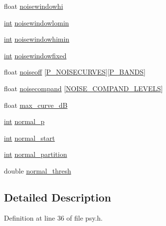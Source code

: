 \begin{DoxyCompactItemize}
float \hyperlink{structvorbis__info__psy_a8337b6979fcf921b4f975f3a88cf0394}{noisewindowhi}
\item 
\hyperlink{xmltok_8h_a5a0d4a5641ce434f1d23533f2b2e6653}{int} \hyperlink{structvorbis__info__psy_a2db09fd0e801f1b6f2c99850391fd940}{noisewindowlomin}
\item 
\hyperlink{xmltok_8h_a5a0d4a5641ce434f1d23533f2b2e6653}{int} \hyperlink{structvorbis__info__psy_ae3d1c2bece355a1dc347ea0f04e51a38}{noisewindowhimin}
\item 
\hyperlink{xmltok_8h_a5a0d4a5641ce434f1d23533f2b2e6653}{int} \hyperlink{structvorbis__info__psy_a6cb2aeec6204b044c4b4279c22e22d56}{noisewindowfixed}
\item 
float \hyperlink{structvorbis__info__psy_aa9386a43b2fed4d8d322beeb86ca716c}{noiseoff} \mbox{[}\hyperlink{psy_8h_a179ea3e4fa2cdb1ef235e922ea51405a}{P\+\_\+\+N\+O\+I\+S\+E\+C\+U\+R\+V\+ES}\mbox{]}\mbox{[}\hyperlink{psy_8h_ae6af2ec0a0f6e0813ae814e9a07c728a}{P\+\_\+\+B\+A\+N\+DS}\mbox{]}
\item 
float \hyperlink{structvorbis__info__psy_a30e0f5a53a3803feabbe826578c8a5e7}{noisecompand} \mbox{[}\hyperlink{psy_8h_a370d177dee7c7401b0c46ed37310d54b}{N\+O\+I\+S\+E\+\_\+\+C\+O\+M\+P\+A\+N\+D\+\_\+\+L\+E\+V\+E\+LS}\mbox{]}
\item 
float \hyperlink{structvorbis__info__psy_a8aeb497662b106e241bd3232016aba66}{max\+\_\+curve\+\_\+dB}
\item 
\hyperlink{xmltok_8h_a5a0d4a5641ce434f1d23533f2b2e6653}{int} \hyperlink{structvorbis__info__psy_ae6765718469a8efa31817f451996951f}{normal\+\_\+p}
\item 
\hyperlink{xmltok_8h_a5a0d4a5641ce434f1d23533f2b2e6653}{int} \hyperlink{structvorbis__info__psy_a04680a3cb4a277fa8534e23d62e8939b}{normal\+\_\+start}
\item 
\hyperlink{xmltok_8h_a5a0d4a5641ce434f1d23533f2b2e6653}{int} \hyperlink{structvorbis__info__psy_a96b80a288323a1ce2fc2e9f65d48c5b1}{normal\+\_\+partition}
\item 
double \hyperlink{structvorbis__info__psy_ac733f35b4ca08d41b3de512e903e3ae0}{normal\+\_\+thresh}
\end{DoxyCompactItemize}


\subsection{Detailed Description}


Definition at line 36 of file psy.\+h.



